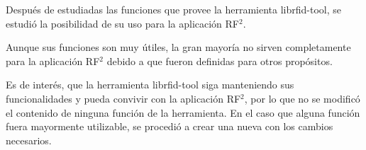 \documentclass[%
        final,
        notitlepage,
        narroweqnarray,
        inline,
        ]{ieee}
\begin{document}


%
%
%

%
%
%
%


Después de estudiadas las funciones que provee la herramienta librfid-tool, se estudió la posibilidad de su uso para la aplicación RF$^{2}$. 

Aunque sus funciones  son muy útiles, la gran mayoría no sirven completamente para la aplicación RF$^{2}$ debido a que fueron definidas para otros propósitos. 

Es de interés, que la herramienta librfid-tool siga manteniendo sus funcionalidades y pueda convivir con la aplicación RF$^{2}$, por lo que no se modificó el contenido de ninguna función de la herramienta. En el caso que alguna función fuera mayormente utilizable, se procedió a crear una nueva con los cambios necesarios.
\end{document}
